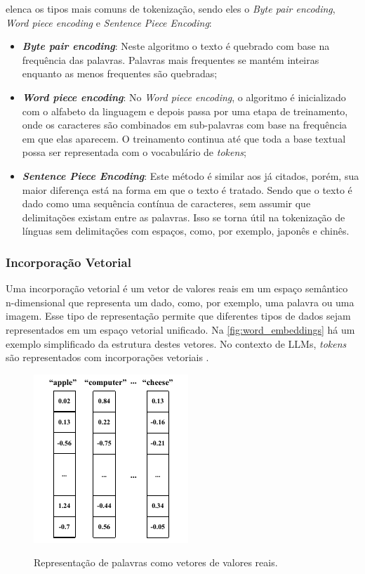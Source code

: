 \textcite{llm_survey_2024} elenca os tipos mais comuns de tokenização, sendo eles o \textit{Byte pair encoding},
\textit{Word piece encoding} e \textit{Sentence Piece Encoding}:

\begin{itemize}
    \item \textbf{\textit{Byte pair encoding}}: Neste algoritmo o texto é quebrado com base na frequência das palavras. Palavras
          mais frequentes se mantém inteiras enquanto as menos frequentes são quebradas;
    \item \textbf{\textit{Word piece encoding}}: No \textit{Word piece encoding}, o algoritmo é inicializado com o alfabeto da
          linguagem e depois passa por uma etapa de treinamento, onde os caracteres são combinados em sub-palavras com base na
          frequência em que elas aparecem. O treinamento continua até que toda a base textual possa ser representada com o
          vocabulário de \textit{tokens};
    \item \textbf{\textit{Sentence Piece Encoding}}: Este método é similar aos já citados, porém, sua maior diferença está na
          forma em que o texto é tratado. Sendo que o texto é dado como uma sequência contínua de caracteres, sem assumir que
          delimitações existam entre as palavras. Isso se torna útil na tokenização de línguas sem delimitações com espaços,
          como, por exemplo, japonês e chinês.
\end{itemize}

\subsubsection{Incorporação Vetorial}

Uma incorporação vetorial é um vetor de valores reais em um espaço semântico n-dimensional que representa um dado,
como, por exemplo, uma palavra ou uma imagem. Esse tipo de representação permite que diferentes tipos de dados sejam
representados em um espaço vetorial unificado. Na \autoref{fig:word_embeddings} há um exemplo simplificado da estrutura
destes vetores. No contexto de \acp{LLM}, \textit{tokens} são representados com incorporações vetoriais
\cite{word_embedding, mllm_survey_2023}.

\begin{figure}[ht]
    \centering
    \caption{\small Representação de palavras como vetores de valores reais.}
    \includegraphics[width=0.3\columnwidth,keepaspectratio]{images/word_embeddings.pdf}
    \label{fig:word_embeddings}
\end{figure}

